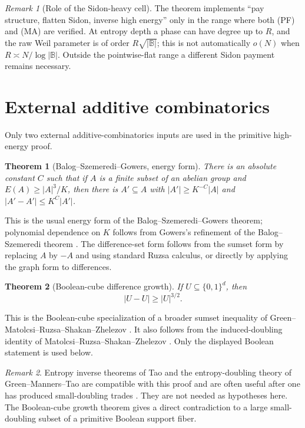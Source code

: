 \documentclass[12pt,a4paper]{amsart}
\numberwithin{equation}{section}
\newtheorem{theorem}{Theorem}[section]
\theoremstyle{remark}
\newtheorem{remark}[remark]{Remark}
\newcommand{\B}{\mathbb B}
\newcommand{\abs}[1]{\lvert #1\rvert}
\begin{document}
\begin{remark}[Role of the Sidon-heavy cell]
The theorem implements ``pay structure, flatten Sidon, inverse high energy''
only in the range where both \textup{(PF)} and \textup{(MA)} are verified.
At entropy depth a phase
can have degree up to \(R\), and the raw Weil parameter is of order
\(R\sqrt{\abs\B}\); this is not automatically \(o(N)\) when
\(R\asymp N/\log\abs\B\).  Outside the pointwise-flat range a different
Sidon payment remains necessary.
\end{remark}

\section{External additive combinatorics}\label{sec:additive-tools}

Only two external additive-combinatorics inputs are used in the primitive high-energy proof.

\begin{theorem}[Balog--Szemeredi--Gowers, energy form]\label{thm:bsg}
There is an absolute constant \(C\) such that if \(A\) is a finite subset of an abelian group and \(E(A)\ge \abs A^3/K\), then there is \(A'\subseteq A\) with \(\abs{A'}\ge K^{-C}\abs A\) and \(\abs{A'-A'}\le K^C\abs{A'}\).
\end{theorem}

This is the usual energy form of the Balog--Szemeredi--Gowers theorem; polynomial dependence on \(K\) follows from Gowers's refinement of the Balog--Szemeredi theorem \cite{BalogSzemeredi,GowersSzemeredi}.  The difference-set form follows from the sumset form by replacing \(A\) by \(-A\) and using standard Ruzsa calculus, or directly by applying the graph form to differences.

\begin{theorem}[Boolean-cube difference growth]\label{thm:quasicube}
If \(U\subseteq\{0,1\}^d\), then
\[
                  \abs{U-U}\ge \abs U^{3/2}.
\]
\end{theorem}

This is the Boolean-cube specialization of a broader sumset inequality
of Green--Matolcsi--Ruzsa--Shakan--Zhelezov
\cite{GreenMatolcsiRuzsaShakanZhelezov}.  It also follows from the
induced-doubling identity of Matolcsi--Ruzsa--Shakan--Zhelezov
\cite{MatolcsiRuzsaShakanZhelezov}.  Only the displayed Boolean statement
is used below.

\begin{remark}
Entropy inverse theorems of Tao and the entropy-doubling theory of Green--Manners--Tao are compatible with this proof and are often useful after one has produced small-doubling trades \cite{TaoEntropy,GreenMannersTao}.  They are not needed as hypotheses here.  The Boolean-cube growth theorem gives a direct contradiction to a large small-doubling subset of a primitive Boolean support fiber.
\end{remark}
\end{document}
